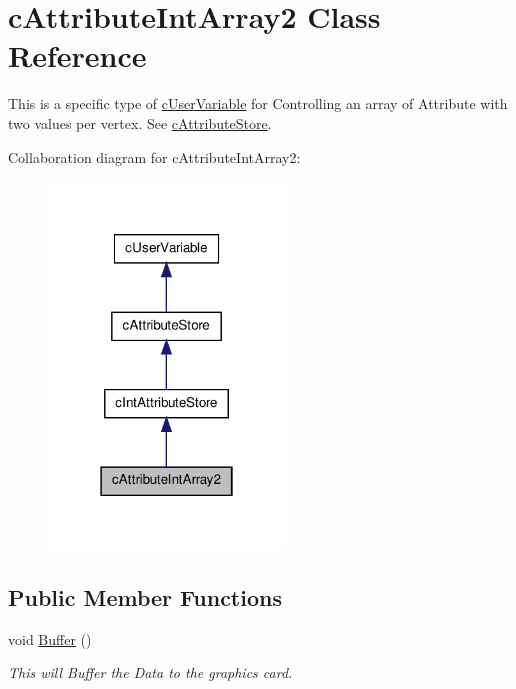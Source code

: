 \hypertarget{classc_attribute_int_array2}{
\section{cAttributeIntArray2 Class Reference}
\label{classc_attribute_int_array2}
}


This is a specific type of \hyperlink{classc_user_variable}{cUserVariable} for Controlling an array of Attribute with two values per vertex. See \hyperlink{classc_attribute_store}{cAttributeStore}.  




Collaboration diagram for cAttributeIntArray2:\nopagebreak
\begin{figure}[H]
\begin{center}
\leavevmode
\includegraphics[width=178pt]{classc_attribute_int_array2__coll__graph}
\end{center}
\end{figure}
\subsection*{Public Member Functions}
\begin{DoxyCompactItemize}
\item 
\hypertarget{classc_attribute_int_array2_a7165fa2567c9a78f406b8c2e9d5a82e8}{
void \hyperlink{classc_attribute_int_array2_a7165fa2567c9a78f406b8c2e9d5a82e8}{Buffer} ()}
\label{classc_attribute_int_array2_a7165fa2567c9a78f406b8c2e9d5a82e8}

\begin{DoxyCompactList}\small\item\em This will Buffer the Data to the graphics card. \end{DoxyCompactList}\end{DoxyCompactItemize}


